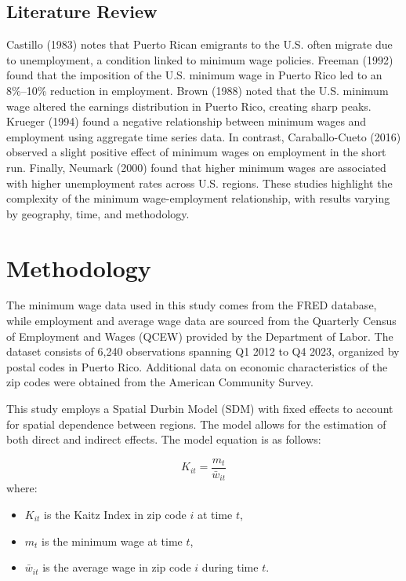 \documentclass[AEJ]{AEA}
\begin{document}
\subsection{Literature Review}

Castillo (1983) notes that Puerto Rican emigrants to the U.S. often migrate due to unemployment, a condition linked to minimum wage policies. Freeman (1992) found that the imposition of the U.S. minimum wage in Puerto Rico led to an 8\%–10\% reduction in employment. Brown (1988) noted that the U.S. minimum wage altered the earnings distribution in Puerto Rico, creating sharp peaks. Krueger (1994) found a negative relationship between minimum wages and employment using aggregate time series data. In contrast, Caraballo-Cueto (2016) observed a slight positive effect of minimum wages on employment in the short run. Finally, Neumark (2000) found that higher minimum wages are associated with higher unemployment rates across U.S. regions. These studies highlight the complexity of the minimum wage-employment relationship, with results varying by geography, time, and methodology.

\section{Methodology}

The minimum wage data used in this study comes from the FRED database, while employment and average wage data are sourced from the Quarterly Census of Employment and Wages (QCEW) provided by the Department of Labor. The dataset consists of 6,240 observations spanning Q1 2012 to Q4 2023, organized by postal codes in Puerto Rico. Additional data on economic characteristics of the zip codes were obtained from the American Community Survey.

This study employs a Spatial Durbin Model (SDM) with fixed effects to account for spatial dependence between regions. The model allows for the estimation of both direct and indirect effects. The model equation is as follows:

\[
	K_{it} = \frac{m_t}{\bar{w}_{it}}
\]
where:
\begin{itemize}
	\item $K_{it}$ is the Kaitz Index in zip code $i$ at time $t$,
	\item $m_t$ is the minimum wage at time $t$,
	\item $\bar{w}_{it}$ is the average wage in zip code $i$ during time $t$.
\end{itemize}
\end{document}
